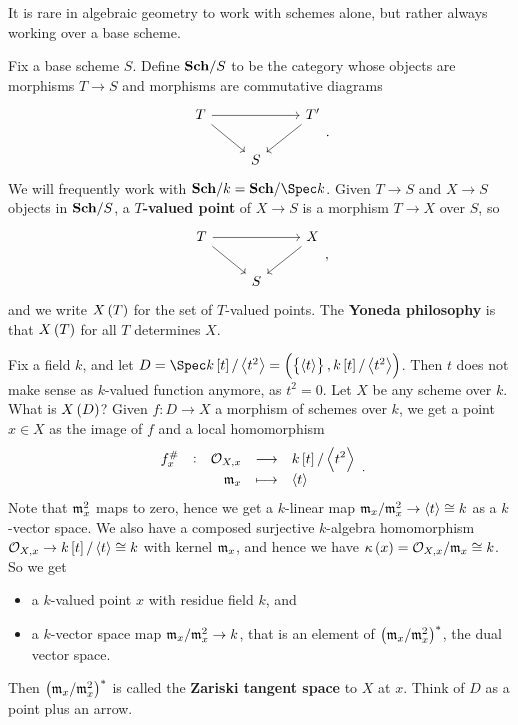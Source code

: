 \begin{remark*}
It is rare in algebraic geometry to work with schemes alone, but rather always working over a base scheme.
\end{remark*}

Fix a base scheme $ S $. Define $ \textbf{Sch} / S $ to be the category whose objects are morphisms $ T \to S $ and morphisms are commutative diagrams
$$
\begin{tikzcd}
T \arrow{rr} \arrow{dr} & & T' \arrow{dl} \\
& S &
\end{tikzcd}.
$$
We will frequently work with $ \Sch / k = \Sch / \Spec k $. Given $ T \to S $ and $ X \to S $ objects in $ \textbf{Sch} / S $, a \textbf{$ T $-valued point} of $ X \to S $ is a morphism $ T \to X $ over $ S $, so
$$
\begin{tikzcd}
T \arrow{rr} \arrow{dr} & & X \arrow{dl} \\
& S &
\end{tikzcd},
$$
and we write $ X\br{T} $ for the set of $ T $-valued points. The \textbf{Yoneda philosophy} is that $ X\br{T} $ for all $ T $ determines $ X $.

\pagebreak

\begin{example*}
Fix a field $ k $, and let $ D = \Spec k\sbr{t} / \abr{t^2} = \br{\cbr{\abr{t}}, k\sbr{t} / \abr{t^2}} $. Then $ t $ does not make sense as $ k $-valued function anymore, as $ t^2 = 0 $. Let $ X $ be any scheme over $ k $. What is $ X\br{D} $? Given $ f : D \to X $ a morphism of schemes over $ k $, we get a point $ x \in X $ as the image of $ f $ and a local homomorphism
$$ \function[f_x^\#]{\OOO_{X, x}}{k\sbr{t} / \abr{t^2}}{\mmm_x}{\abr{t}}. $$
Note that $ \mathfrak{m}_x^2 $ maps to zero, hence we get a $ k $-linear map $ \mathfrak{m}_x / \mathfrak{m}_x^2 \to \left\langle t \right\rangle \cong k $ as a $ k $-vector space. We also have a composed surjective $ k $-algebra homomorphism $ \OOO_{X, x} \to k\sbr{t} / \abr{t} \cong k $ with kernel $ \mathfrak{m}_x $, and hence we have $ \kappa\br{x} = \OOO_{X, x} / \mmm_x \cong k $. So we get
\begin{itemize}
\item a $ k $-valued point $ x $ with residue field $ k $, and
\item a $ k $-vector space map $ \mathfrak{m}_x / \mathfrak{m}_x^2 \to k $, that is an element of $ \br{\mmm_x / \mmm_x^2}^* $, the dual vector space.
\end{itemize}
Then $ \br{\mmm_x / \mmm_x^2}^* $ is called the \textbf{Zariski tangent space} to $ X $ at $ x $. Think of $ D $ as a point plus an arrow.
\end{example*}


